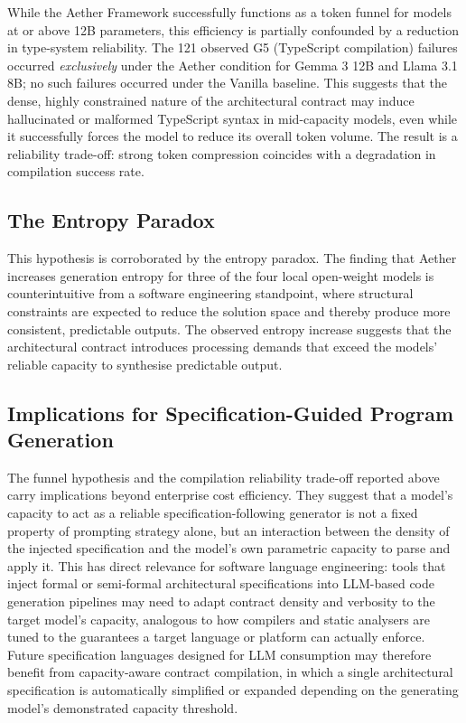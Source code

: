 \documentclass[review,12pt,3p]{elsarticle}
\begin{document}
While the Aether Framework successfully functions as a token funnel for models at or above 12B parameters, this efficiency is partially confounded by a reduction in type-system reliability. The 121 observed G5 (TypeScript compilation) failures occurred \emph{exclusively} under the Aether condition for Gemma 3 12B and Llama 3.1 8B; no such failures occurred under the Vanilla baseline. This suggests that the dense, highly constrained nature of the architectural contract may induce hallucinated or malformed TypeScript syntax in mid-capacity models, even while it successfully forces the model to reduce its overall token volume. The result is a reliability trade-off: strong token compression coincides with a degradation in compilation success rate.

\subsection{The Entropy Paradox}

This hypothesis is corroborated by the entropy paradox. The finding that Aether increases generation
entropy for three of the four local open-weight models is counterintuitive from a software engineering standpoint,
where structural constraints are expected to reduce the solution space and thereby produce more consistent,
predictable outputs. The observed entropy increase suggests that the architectural contract introduces
processing demands that exceed the models' reliable capacity to synthesise predictable output.

\subsection{Implications for Specification-Guided Program Generation}

The funnel hypothesis and the compilation reliability trade-off reported above carry
implications beyond enterprise cost efficiency. They suggest that a model's capacity to
act as a reliable specification-following generator is not a fixed property of prompting
strategy alone, but an interaction between the density of the injected specification and
the model's own parametric capacity to parse and apply it. This has direct relevance for
software language engineering: tools that inject formal or semi-formal architectural
specifications into LLM-based code generation pipelines may need to adapt contract density
and verbosity to the target model's capacity, analogous to how compilers and static
analysers are tuned to the guarantees a target language or platform can actually enforce.
Future specification languages designed for LLM consumption may therefore benefit from
capacity-aware contract compilation, in which a single architectural specification is
automatically simplified or expanded depending on the generating model's demonstrated
capacity threshold.
\end{document}
